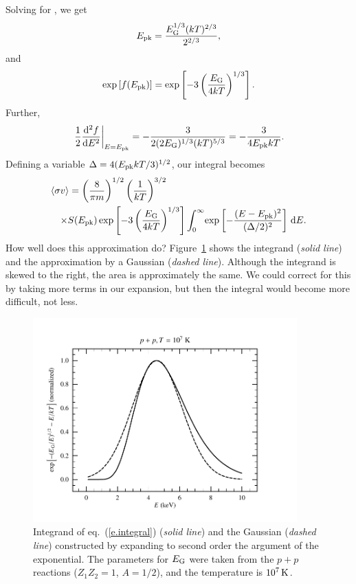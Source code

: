 Solving for \Epk, we get
\[
E_{\mathrm{pk}} = \frac{E_{\mathrm{G}}^{1/3}(kT)^{2/3}}{2^{2/3}},
\]
and 
\[ \exp\left[f(E_{\mathrm{pk}})\right] = \exp\left[-3\left(\frac{E_{\mathrm{G}}}{4kT}\right)^{1/3}\right].
\]
Further,
\[
\left.\frac{1}{2}\frac{\mathrm{d}^{2}f}{\mathrm{d} E^{2}}\right|_{E=E_{\mathrm{pk}}} = -\frac{3}{2(2E_{\mathrm{G}})^{1/3}(kT)^{5/3}} = -\frac{3}{4E_{\mathrm{pk}} kT}.
\]
Defining a variable $\Delta = 4(E_{\mathrm{pk}} kT/3)^{1/2}$, our integral becomes
\begin{eqnarray}\label{e.integral2}
\lefteqn{\langle\sigma v\rangle = \left(\frac{8}{\pi m}\right)^{1/2}\left(\frac{1}{kT}\right)^{3/2}}\nonumber\\
&&\times S(\Epk)
  \exp\left[-3\left(\frac{\EG}{4kT}\right)^{1/3}\right]
  \int_{0}^{\infty}\!\exp\left[-\frac{(E-\Epk)^{2}}{(\Delta/2)^{2}}\right]\,\dif E.
\end{eqnarray}
How well does this approximation do?  Figure~\ref{f.integrand} shows the integrand (\emph{solid line}) and the approximation by a Gaussian (\emph{dashed line}).  Although the integrand is skewed to the right, the area is approximately the same.  We could correct for this by taking more terms in our expansion, but then the integral would become more difficult, not less.

\begin{figure}[htbp]
\includegraphics[width=4in]{plots_out/coulomb_integrand}
\caption{Integrand of eq.~(\protect\ref{e.integral}) (\emph{solid line}) and the Gaussian (\emph{dashed line}) constructed by expanding to second order the argument of the exponential. The parameters for $E_{\mathrm{G}}$ were taken from the $p+p$ reactions ($Z_{1}Z_{2}=1$, $A = 1/2$), and the temperature is $10^{7}\,\mathrm{K}$.}
\label{f.integrand}
\end{figure}

